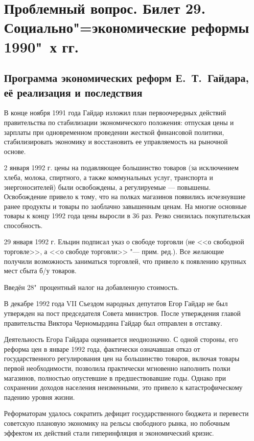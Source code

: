 \section{\textbf{Проблемный вопрос}. Билет 29. Социально"=экономические реформы 1990"~х гг.}
\subsection{Программа экономических реформ Е.~Т.~Гайдара, её реализация и последствия}
В конце ноября 1991 года Гайдар изложил план первоочередных действий правительства по стабилизации экономического положения: отпуская цены и зарплаты при одновременном проведении жесткой финансовой политики, стабилизировать экономику и восстановить ее управляемость на рыночной основе.

2 января 1992 г. цены на подавляющее большинство товаров (за исключением хлеба, молока, спиртного, а также коммунальных услуг, транспорта и энергоносителей) были освобождены, а регулируемые --- повышены. Освобождение привело к тому, что на полках магазинов появились исчезнувшие ранее продукты и товары по заоблачно завышенным ценам. На многие основные товары к концу 1992 года цены выросли в 36 раз. Резко снизилась покупательская способность.

29 января 1992 г. Ельцин подписал указ о свободе торговли (не <<о свободной торговле>>, а <<о свободе торговли>> "--- прим. ред.). Все желающие получили возможность заниматься торговлей, что привело к появлению крупных мест сбыта б/у товаров.

Введён 28"~процентный налог на добавленную стоимость.

В декабре 1992 года VII Съездом народных депутатов Егор Гайдар не был утвержден на пост председателя Совета министров. После утверждения главой правительства Виктора Черномырдина Гайдар был отправлен в отставку.

Деятельность Егора Гайдара оценивается неоднозначно. С одной стороны, его реформа цен в январе 1992 года, фактически означавшая отказ от государственного регулирования цен на большинство товаров, включая товары первой необходимости, позволила практически мгновенно наполнить полки магазинов, полностью опустевшие в предшествовавшие годы. Однако при сохранении доходов населения неизменными, это привело к катастрофическому падению уровня жизни.

Реформаторам удалось сократить дефицит государственного бюджета и перевести советскую плановую экономику на рельсы свободного рынка, но побочным эффектом их действий стали гиперинфляция и экономический кризис.
